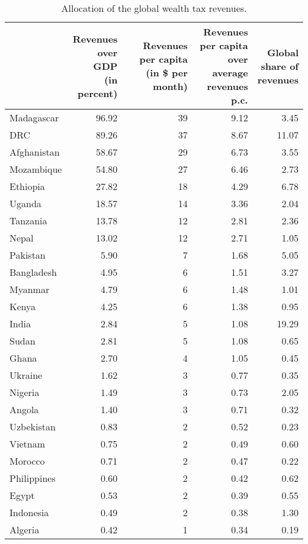 
\begin{longtable}[t]{lrrrr}
\caption{\label{tab:allocation}Allocation of the global wealth tax revenues.}\\
\toprule
  & \makecell{Revenues\\over GDP\\(in percent)} & \makecell{Revenues\\per capita\\(in \$ per month)} & \makecell{Revenues per capita\\over average\\revenues p.c.} & \makecell{Global\\share of\\revenues}\\
\midrule
Madagascar & 96.92 & 39 & 9.12 & 3.45\\
DRC & 89.26 & 37 & 8.67 & 11.07\\
Afghanistan & 58.67 & 29 & 6.73 & 3.55\\
Mozambique & 54.80 & 27 & 6.46 & 2.73\\
Ethiopia & 27.82 & 18 & 4.29 & 6.78\\
Uganda & 18.57 & 14 & 3.36 & 2.04\\
Tanzania & 13.78 & 12 & 2.81 & 2.36\\
Nepal & 13.02 & 12 & 2.71 & 1.05\\
Pakistan & 5.90 & 7 & 1.68 & 5.05\\
Bangladesh & 4.95 & 6 & 1.51 & 3.27\\
Myanmar & 4.79 & 6 & 1.48 & 1.01\\
Kenya & 4.25 & 6 & 1.38 & 0.95\\
India & 2.84 & 5 & 1.08 & 19.29\\
Sudan & 2.81 & 5 & 1.08 & 0.65\\
Ghana & 2.70 & 4 & 1.05 & 0.45\\
Ukraine & 1.62 & 3 & 0.77 & 0.35\\
Nigeria & 1.49 & 3 & 0.73 & 2.05\\
Angola & 1.40 & 3 & 0.71 & 0.32\\
Uzbekistan & 0.83 & 2 & 0.52 & 0.23\\
Vietnam & 0.75 & 2 & 0.49 & 0.60\\
Morocco & 0.71 & 2 & 0.47 & 0.22\\
Philippines & 0.60 & 2 & 0.42 & 0.62\\
Egypt & 0.53 & 2 & 0.39 & 0.55\\
Indonesia & 0.49 & 2 & 0.38 & 1.30\\
Algeria & 0.42 & 1 & 0.34 & 0.19\\

\end{longtable}
